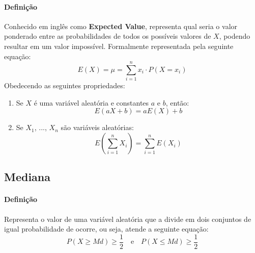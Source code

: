 \documentclass{article}
\begin{document}
            \paragraph{Definição}Conhecido em inglês como \textbf{Expected Value}, representa qual seria o valor ponderado entre as probabilidades de todos os possíveis valores de $X$, podendo resultar em um valor impossível. Formalmente representada pela seguinte equação:
                \begin{equation}
                    \boxed{
                        E(X) = \mu = 
                        \sum_{i=1}^{n} x_{i} \cdot P(X = x_{i})
                    }
                \end{equation}
            Obedecendo as seguintes propriedades:
                \begin{enumerate}[rightmargin = \leftmargin, noitemsep]
                    \item Se $X$ é uma variável aleatória e constantes $a$ e $b$, então:
                        \begin{equation}
                            \boxed{
                                E(a X + b) = a E(X) + b
                            }
                        \end{equation}
                    \item Se $X_{1}$, ..., $X_{n}$ são variáveis aleatórias:
                        \begin{equation}
                            \boxed{
                                E \left( \sum_{i=1}^{n} X_{i} \right) = \sum_{i=1}^{n} E(X_{i})
                            }
                        \end{equation}
                \end{enumerate}

        \subsection{Mediana}
            \paragraph{Definição}Representa o valor de uma variável aleatória que a divide em dois conjuntos de igual probabilidade de ocorre, ou seja, atende a seguinte equação:
                \begin{equation}
                    \boxed{
                        P(X\ge Md) \ge \frac{1}{2}
                    }
                    \quad
                    \text{e}
                    \quad
                    \boxed{
                        P(X\le Md) \ge \frac{1}{2}
                    }
                \end{equation}
\end{document}
